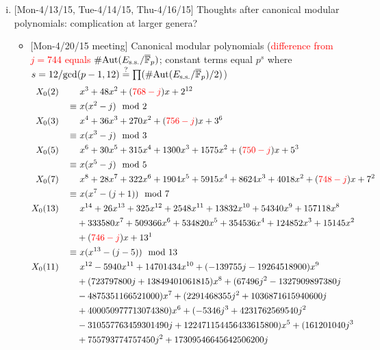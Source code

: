\documentclass{rs}
\theoremstyle{definition}
\theoremstyle{remark}
\newcommand{\mb}[1]{\mathbb{#1}}
\newcommand{\Aut}{{\rm Aut}}
\newcommand{\cF}{\overline {\mb F}}
\renewcommand{\gcd}{{\rm gcd}}
\newcommand{\md}{~~{\rm mod}~}
\renewcommand{\=}{\approx}
\renewcommand{\-}{\sim}
\newcommand{\rd}[1]{\textcolor{red}{#1}}
\numberwithin{equation}{section}
\numberwithin{thm}{section}
\begin{document}
\begin{enumerate}[(i)]
 \item {[Mon-4/13/15, Tue-4/14/15, Thu-4/16/15]} 
 Thoughts after canonical modular polynomials: complication at larger genera?  
 \begin{itemize}
  \item {[Mon-4/20/15 meeting]} Canonical modular polynomials 
  (\rd{difference from $j = 744$ equals $\#\Aut(E_\text{s.s.}/\cF_p)$}; 
  constant terms equal $p^s$ where $s = 12 / \gcd(p - 1, 12) \stackrel{?}{=} \prod (\#\Aut(E_\text{s.s.}/\cF_p)/2)$) 
  \begin{equation*}
   \begin{split}
     X_0(2) \qquad & ~ x^3+48 x^2+(\rd{768-j}) x+2^{12} \\
            \equiv & ~ x (x^2 - j) \md 2 \\
     X_0(3) \qquad & ~ x^4+36 x^3+270 x^2+(\rd{756-j}) x+3^6 \\
            \equiv & ~ x (x^3 - j) \md 3 \\
     X_0(5) \qquad & ~ x^6+30 x^5+315 x^4+1300 x^3+1575 x^2+(\rd{750-j}) x+5^3 \\
            \equiv & ~ x (x^5 - j) \md 5 \\
     X_0(7) \qquad & ~ x^8+28 x^7+322 x^6+1904 x^5+5915 x^4+8624 x^3+4018 x^2+(\rd{748-j}) x+7^2 \\
            \equiv & ~ x (x^7 - (j + 1)) \md 7 \\
    X_0(13) \qquad & ~ x^{14}+26 x^{13}+325 x^{12}+2548 x^{11}+13832 x^{10}+54340 x^9+157118 x^8 \\
                   & +333580 x^7+509366 x^6+534820 x^5+354536 x^4+124852 x^3+15145 x^2 \\
                   & +(\rd{746-j}) x+13^1 \\
            \equiv & ~ x (x^{13} - (j - 5)) \md 13 \\
    X_0(11) \qquad & ~ x^{12}-5940 x^{11}+14701434 x^{10}+(-139755 j-19264518900) x^9 \\
                   & +(723797800 j +13849401061815) x^8+(67496 j^2-1327909897380 j \\
                   & -4875351166521000) x^7+(2291468355 j^2+1036871615940600 j \\
                   & +400050977713074380) x^6+(-5346 j^3+4231762569540 j^2 \\
                   & -310557763459301490 j+122471154456433615800) x^5+(161201040 j^3 \\
                   & +755793774757450 j^2+17309546645642506200 j \\

\end{split}
\end{equation*}
\end{itemize}
\end{enumerate}
\end{document}

